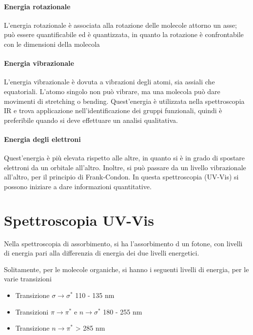 \paragraph{Energia rotazionale}
L'energia rotazionale è associata alla rotazione delle molecole attorno un asse; può essere quantificabile ed è quantizzata, in quanto la rotazione è confrontabile con le dimensioni della molecola

\paragraph{Energia vibrazionale}
L'energia vibrazionale è dovuta a vibrazioni degli atomi, sia assiali che equatoriali. L'atomo singolo non può vibrare, ma una molecola può dare movimenti di stretching o bending.
Quest'energia è utilizzata nella spettroscopia IR e trova applicazione nell'identificazione dei gruppi funzionali, quindi è preferibile quando si deve effettuare un analisi qualitativa.


\paragraph{Energia degli elettroni}
Quest'energia è più elevata rispetto alle altre, in quanto si è in grado di spostare elettroni da un orbitale all'altro. Inoltre, si può passare da un livello vibrazionale all'altro, per il principio di Frank-Condon.
In questa spettroscopia (UV-Vis) si possono iniziare a dare informazioni quantitative.

\section{Spettroscopia UV-Vis}
Nella spettroscopia di assorbimento, si ha l'assorbimento d un fotone, con livelli di energia pari alla differenzia di energia dei due livelli energetici.


Solitamente, per le molecole organiche, si hanno i seguenti livelli di energia, per le varie transizioni
\begin{itemize}
\item Transizione $\sigma \to \sigma^\ast$ 110 - 135 nm
\item Transizioni $\pi \to \pi^\ast$ e $n \to \sigma^\ast$ 180 - 255 nm
\item Transizione $n \to \pi^\ast$ > 285 nm
\end{itemize}

